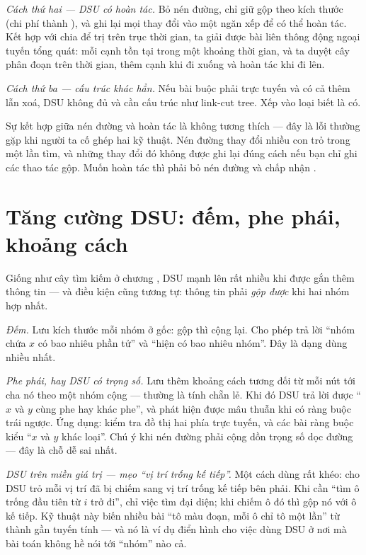 \documentclass[../../algorithm.tex]{subfiles}
\begin{document}
\emph{Cách thứ hai --- DSU có hoàn tác.} Bỏ nén đường, chỉ giữ gộp theo kích thước (chi phí thành ), và ghi lại mọi thay đổi vào một ngăn xếp để có thể hoàn tác. Kết hợp với chia để trị trên trục thời gian, ta giải được bài liên thông động ngoại tuyến tổng quát: mỗi cạnh tồn tại trong một khoảng thời gian, và ta duyệt cây phân đoạn trên thời gian, thêm cạnh khi đi xuống và hoàn tác khi đi lên.

\emph{Cách thứ ba --- cấu trúc khác hẳn.} Nếu bài buộc phải trực tuyến và có cả thêm lẫn xoá, DSU không đủ và cần cấu trúc như link-cut tree. Xếp vào loại biết là có.

\begin{cambay}
Sự kết hợp giữa nén đường và hoàn tác là không tương thích --- đây là lỗi thường gặp khi người ta cố ghép hai kỹ thuật. Nén đường thay đổi nhiều con trỏ trong một lần tìm, và những thay đổi đó không được ghi lại đúng cách nếu bạn chỉ ghi các thao tác gộp. Muốn hoàn tác thì phải bỏ nén đường và chấp nhận .
\end{cambay}

\section{Tăng cường DSU: đếm, phe phái, khoảng cách}

Giống như cây tìm kiếm ở chương , DSU mạnh lên rất nhiều khi được gắn thêm thông tin --- và điều kiện cũng tương tự: thông tin phải \emph{gộp được} khi hai nhóm hợp nhất.

\emph{Đếm.} Lưu kích thước mỗi nhóm ở gốc: gộp thì cộng lại. Cho phép trả lời ``nhóm chứa \(x\) có bao nhiêu phần tử'' và ``hiện có bao nhiêu nhóm''. Đây là dạng dùng nhiều nhất.

\emph{Phe phái, hay DSU có trọng số.} Lưu thêm khoảng cách tương đối từ mỗi nút tới cha nó theo một nhóm cộng --- thường là tính chẵn lẻ. Khi đó DSU trả lời được ``\(x\) và \(y\) cùng phe hay khác phe'', và phát hiện được mâu thuẫn khi có ràng buộc trái ngược. Ứng dụng: kiểm tra đồ thị hai phía trực tuyến, và các bài ràng buộc kiểu ``\(x\) và \(y\) khác loại''. Chú ý khi nén đường phải cộng dồn trọng số dọc đường --- đây là chỗ dễ sai nhất.

\emph{DSU trên miền giá trị --- mẹo ``vị trí trống kế tiếp''.} Một cách dùng rất khéo: cho DSU trỏ mỗi vị trí đã bị chiếm sang vị trí trống kế tiếp bên phải. Khi cần ``tìm ô trống đầu tiên từ \(i\) trở đi'', chỉ việc tìm đại diện; khi chiếm ô đó thì gộp nó với ô kế tiếp. Kỹ thuật này biến nhiều bài ``tô màu đoạn, mỗi ô chỉ tô một lần'' từ  thành gần tuyến tính --- và nó là ví dụ điển hình cho việc dùng DSU ở nơi mà bài toán không hề nói tới ``nhóm'' nào cả.
\end{document}
